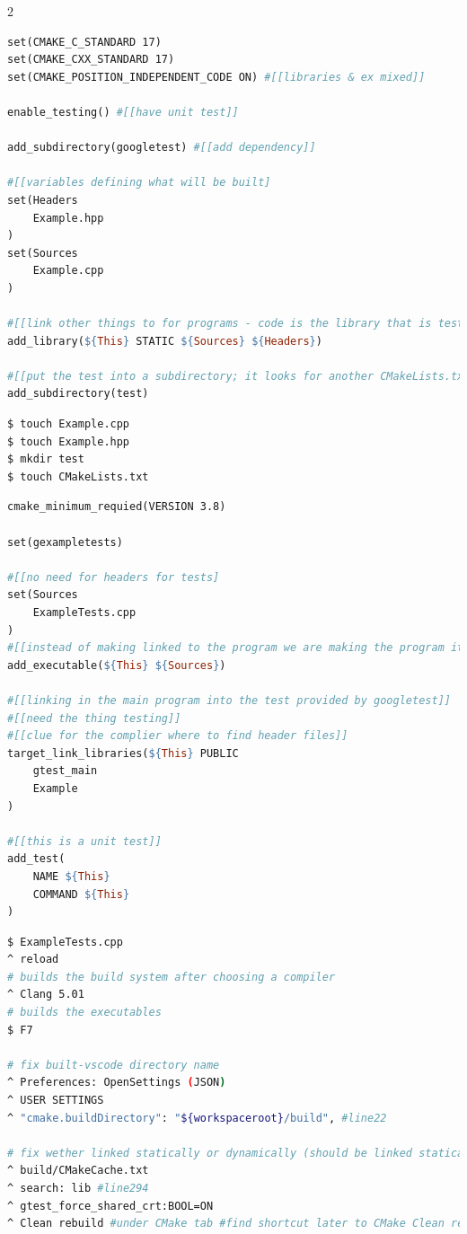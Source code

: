 \documentclass[8pt]{extarticle}
\begin{document}
\begin{small}
\begin{multicols}{2}
\begin{lstlisting}[language=make]
set(CMAKE_C_STANDARD 17)
set(CMAKE_CXX_STANDARD 17)
set(CMAKE_POSITION_INDEPENDENT_CODE ON) #[[libraries & ex mixed]]

enable_testing() #[[have unit test]]

add_subdirectory(googletest) #[[add dependency]]

#[[variables defining what will be built]
set(Headers
	Example.hpp
)
set(Sources
	Example.cpp
)

#[[link other things to for programs - code is the library that is tested and statically linked, gtest is the program]]
add_library(${This} STATIC ${Sources} ${Headers})

#[[put the test into a subdirectory; it looks for another CMakeLists.txt and runs that in a child node in the build system]]
add_subdirectory(test)
\end{lstlisting}

\begin{lstlisting}[language=bash]
$ touch Example.cpp
$ touch Example.hpp
$ mkdir test
$ touch CMakeLists.txt
\end{lstlisting}

\begin{lstlisting}[language=make]
cmake_minimum_requied(VERSION 3.8)

set(gexampletests)

#[[no need for headers for tests]
set(Sources
	ExampleTests.cpp
)
#[[instead of making linked to the program we are making the program itself]]
add_executable(${This} ${Sources})

#[[linking in the main program into the test provided by googletest]]
#[[need the thing testing]]
#[[clue for the complier where to find header files]]
target_link_libraries(${This} PUBLIC
	gtest_main
	Example
)

#[[this is a unit test]]
add_test(
	NAME ${This}
	COMMAND ${This}
)
\end{lstlisting}

\begin{lstlisting}[language=bash]
$ ExampleTests.cpp
^ reload
# builds the build system after choosing a compiler
^ Clang 5.01
# builds the executables
$ F7

# fix built-vscode directory name
^ Preferences: OpenSettings (JSON)
^ USER SETTINGS
^ "cmake.buildDirectory": "${workspaceroot}/build", #line22

# fix wether linked statically or dynamically (should be linked statically)
^ build/CMakeCache.txt
^ search: lib #line294
^ gtest_force_shared_crt:BOOL=ON
^ Clean rebuild #under CMake tab #find shortcut later to CMake Clean rebuild


\end{lstlisting}
\end{multicols}
\end{small}
\end{document}
